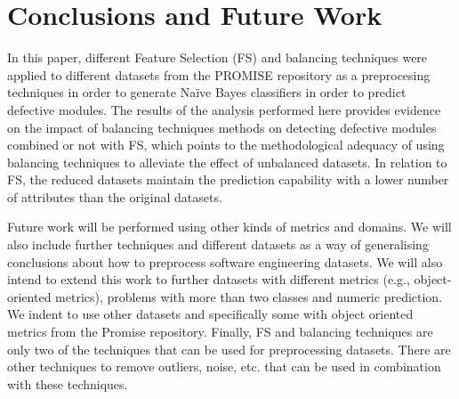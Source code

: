 \documentclass{elsart}
\begin{document}

\section{Conclusions and Future Work}
\label{sec:conclusions}


In this paper, different Feature Selection (FS) and balancing techniques were applied to different datasets from the PROMISE
repository as a preprocesing techniques in order to generate Na\"ive Bayes classifiers in order to predict defective modules. The results of the analysis performed here provides evidence on the impact of balancing techniques methods on detecting defective modules combined or not with FS, which points to the methodological adequacy of using balancing techniques to alleviate the effect of unbalanced datasets. In relation to FS, the reduced datasets maintain the prediction capability with a lower number of attributes than the original datasets.

Future work will be performed using other kinds of metrics and domains. We will also include further techniques and different
datasets as a way of generalising conclusions about how to preprocess software engineering datasets.  We will also intend to extend this work to further datasets with different metrics (e.g., object-oriented metrics), problems with more than two classes and numeric prediction. We indent to use other datasets and specifically some with object oriented metrics from the Promise
repository. Finally, FS and balancing techniques are only two of the techniques that can be used for preprocessing datasets. There are other techniques to remove outliers, noise, etc. that can be used in combination with these techniques.



%




\end{document}
